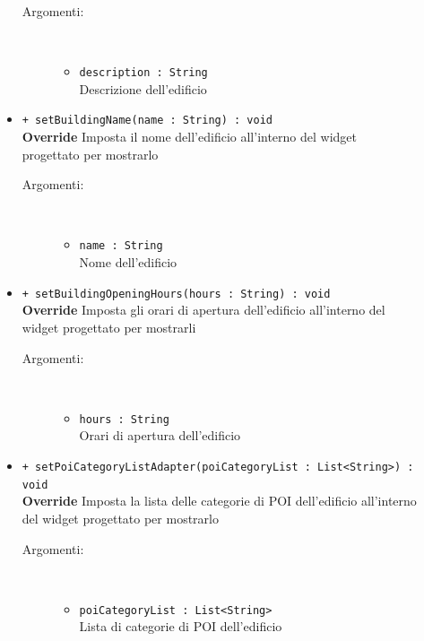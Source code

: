 \documentclass[../DefinizioneDiProdotto.tex]{subfiles}
\begin{document}
\begin{description}
\begin{itemize}
		\begin{description}
			\item[Argomenti:] \
			\begin{itemize}
				\item \texttt{description : String}\\
				Descrizione dell'edificio\end{itemize}
		\end{description}
		\item \texttt{+ setBuildingName(name : String) : void}\\
		\textbf{Override} Imposta il nome dell'edificio all'interno del widget progettato per mostrarlo
		\begin{description}
			\item[Argomenti:] \
			\begin{itemize}
				\item \texttt{name : String}\\
				Nome dell'edificio\end{itemize}
		\end{description}
		\item \texttt{+ setBuildingOpeningHours(hours : String) : void}\\
		\textbf{Override} Imposta gli orari di apertura dell'edificio all'interno del widget progettato per mostrarli
		\begin{description}
			\item[Argomenti:] \
			\begin{itemize}
				\item \texttt{hours : String}\\
				Orari di apertura dell'edificio\end{itemize}
		\end{description}
		\item \texttt{+ setPoiCategoryListAdapter(poiCategoryList : List<String>) : void}\\
		\textbf{Override} Imposta la lista delle categorie di POI dell'edificio all'interno del widget progettato per mostrarlo
		\begin{description}
			\item[Argomenti:] \
			\begin{itemize}
				\item \texttt{poiCategoryList : List<String>}\\
				Lista di categorie di POI dell'edificio\end{itemize}
		\end{description}
	\end{itemize}
\end{description}
\end{document}
